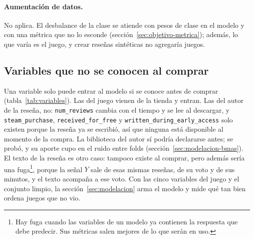 \paragraph{Aumentación de datos.} No aplica. El desbalance de la clase se atiende con pesos de clase
en el modelo y con una métrica que no lo esconde (sección~\ref{sec:objetivo-metrica}); además, lo
que varía es el juego, y crear reseñas sintéticas no agregaría juegos.

\subsection{Variables que no se conocen al comprar}\label{sec:procesamiento-variables}

\begin{table}[htbp]
  \centering\footnotesize
  
  \caption{Variables candidatas: cuándo se conocen y si entran al modelo de riesgo. Fuente:
  \texttt{construir\_features} de \texttt{backend/modelado/entrenar\_baseline.py} y el
  notebook 00, §3.5.}
  \label{tab:variables}
\end{table}

Una variable solo puede entrar al modelo si se conoce antes de comprar (tabla~\ref{tab:variables}).
Las del juego vienen de la tienda y entran. Las del autor de la reseña, no:
\texttt{num\_reviews} cambia con el tiempo y se lee al descargar, y \texttt{steam\_purchase},
\texttt{received\_for\_free} y \texttt{written\_during\_early\_access} solo existen porque la
reseña ya se escribió, así que ninguna está disponible al momento de la compra. La biblioteca del
autor sí podría declararse antes; se probó, y su aporte cupo en el ruido entre folds
(sección~\ref{sec:modelacion-bmas}). El texto de la reseña es otro caso: tampoco existe al
comprar, pero además sería una fuga\footnote{Hay fuga cuando las variables de un modelo ya
contienen la respuesta que debe predecir. Sus métricas salen mejores de lo que serán en uso.},
porque la señal $Y$ sale de esas mismas reseñas, de su voto y de sus minutos, y el texto acompaña a
ese voto. Con las cinco variables del juego y el conjunto limpio, la
sección~\ref{sec:modelacion} arma el modelo y mide qué tan bien ordena juegos que no vio.

